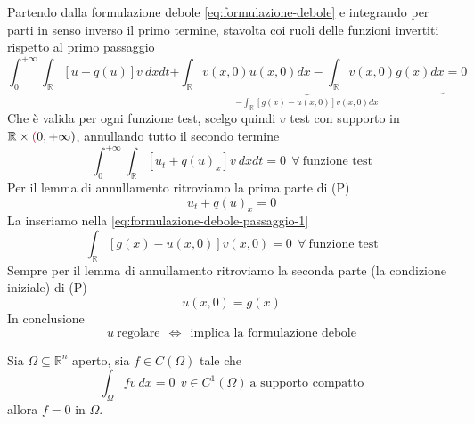 \documentclass[10pt,a4paper,twoside,openright]{book}
\begin{document}
Partendo dalla formulazione debole \eqref{eq:formulazione-debole} e integrando per parti in senso inverso il primo termine, stavolta coi ruoli delle funzioni invertiti rispetto al primo passaggio
\begin{equation}
	\int ^{+\infty }_{0}\int _{\mathbb{R}}[ u+q( u)] v\ dxdt\underbrace{+\int _{\mathbb{R}} v( x,0) u( x,0) dx-\int _{\mathbb{R}} v( x,0) g( x) dx}_{-\int _{\mathbb{R}}[ g( x) -u( x,0)] v( x,0) dx} =0
\label{eq:formulazione-debole-passaggio-1}
\end{equation}
Che è valida per ogni funzione test, scelgo quindi $v$ test con supporto in $\mathbb{R} \times \textcolor[rgb]{0.82,0.01,0.11}{(} 0,+\infty )$, annullando tutto il secondo termine
\begin{equation*}
	\int ^{+\infty }_{0}\int _{\mathbb{R}}[ u_{t} +q( u)_{x}] v\ dxdt=0\ \ \forall \ \text{funzione test}
\end{equation*}
Per il lemma di annullamento ritroviamo la prima parte di (P)
\begin{equation*}
	u_{t} +q( u)_{x} =0
\end{equation*}
La inseriamo nella \eqref{eq:formulazione-debole-passaggio-1}
\begin{equation*}
	\int _{\mathbb{R}}[ g( x) -u( x,0)] v( x,0) =0\ \ \forall \ \text{funzione test}
\end{equation*}
Sempre per il lemma di annullamento ritroviamo la seconda parte (la condizione iniziale) di (P)
\begin{equation*}
	u( x,0) =g( x)
\end{equation*}
In conclusione
\begin{equation}
	u\ \text{regolare} \ \ \Leftrightarrow \ \ \text{implica la formulazione debole}
\end{equation}
\begin{theorem}
	 Sia $\Omega \subseteq \mathbb{R}^{n}$ aperto, sia $f\in C( \Omega )$ tale che
	\begin{equation}
		\int _{\Omega } fv\ dx=0\ \ v\in C^{1}( \Omega ) \ \text{a supporto compatto}
	\end{equation}
	allora $f=0$ in $\Omega $.
\end{theorem}
\end{document}
